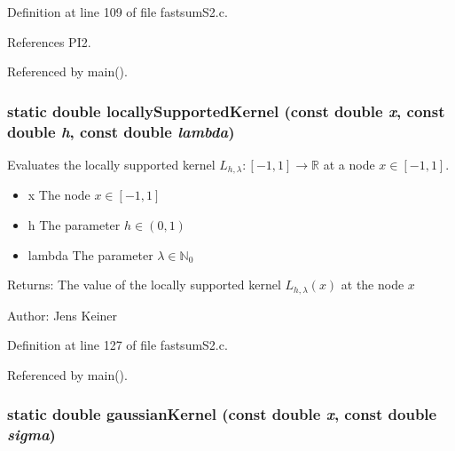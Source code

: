 Definition at line 109 of file fastsumS2.c.

References PI2.

Referenced by main().\hypertarget{group__applications__fastsumS2__test_g226aec741614e0a2d2a9305bc2c28063}{
\subsubsection{\setlength{\rightskip}{0pt plus 5cm}static double locallySupportedKernel (const double {\em x}, const double {\em h}, const double {\em lambda})}}
\label{group__applications__fastsumS2__test_g226aec741614e0a2d2a9305bc2c28063}


Evaluates the locally supported kernel $L_{h,\lambda}: [-1,1] \rightarrow \mathbb{R}$ at a node $x \in [-1,1]$. 

\begin{itemize}
\item x The node $x \in [-1,1]$ \item h The parameter $h \in (0,1)$ \item lambda The parameter $\lambda \in \mathbb{N}_0$\end{itemize}
\begin{Desc}
\item[Returns:]The value of the locally supported kernel $L_{h,\lambda}(x)$ at the node $x$\end{Desc}
\begin{Desc}
\item[Author:]Jens Keiner \end{Desc}


Definition at line 127 of file fastsumS2.c.

Referenced by main().\hypertarget{group__applications__fastsumS2__test_g22bfa09881115e4c4f8fef59538d1ce7}{
\subsubsection{\setlength{\rightskip}{0pt plus 5cm}static double gaussianKernel (const double {\em x}, const double {\em sigma})}}
\label{group__applications__fastsumS2__test_g22bfa09881115e4c4f8fef59538d1ce7}


